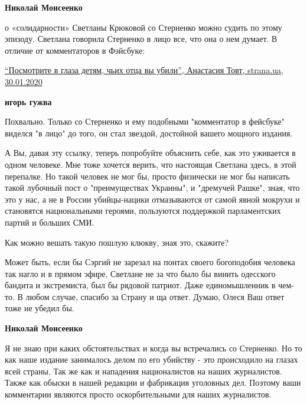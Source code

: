 \begin{itemize}
\begin{itemize}
\textbf{Николай Моисеенко} 

о «солидарности» Светланы Крюковой со Стерненко можно судить по этому эпизоду.
Светлана говорила Стерненко в лицо все, что она о нем думает. В отличие от
комментаторов в Фэйсбуке:

\href{https://strana.ua/articles/special/247259-kak-poruhalis-radikal-serhej-sternenko-i-zhurnalist-svetlana-krjukova.html}{%
\enquote{Посмотрите в глаза детям, чьих отца вы убили}, Анастасия Товт, strana.ua, 30.01.2020%
}

 

\textbf{игорь гужва} 

Похвально. Только со Стерненко и ему подобными "комментатор в фейсбуке" виделся
"в лицо" до того, он стал звездой, достойной вашего мощного издания. 

А Вы, давая эту ссылку, теперь попробуйте объяснить себе, как это уживается в
одном человеке. Мне тоже хочется верить, что настоящая Светлана здесь, в этой
перепалке. Но такой человек не мог бы, просто физически не мог бы написать
такой лубочный пост о "преимуществах Украины", и "дремучей Рашке", зная, что
это у нас, а не в России убийцы-нацики отмазываются от самой явной мокрухи и
становятся национальными героями, пользуются поддержкой парламентских партий и
больших СМИ. 

Как можно вешать такую пошлую клюкву, зная это, скажите?

Может быть, если бы Сэргий не зарезал на понтах своего богоподобия человека так
нагло и в прямом эфире, Светлане не за что было бы винить одесского бандита и
экстремиста, был бы рядовой патриот. Даже единомышленник в чем-то. В любом
случае, спасибо за Страну и ща ответ. Думаю, Олеся Ваш ответ тоже не убедил бы.


 
\textbf{Николай Моисеенко} 

Я не знаю при каких обстоятельствах и когда вы встречались со Стерненко. Но то
как наше издание занималось делом по его убийству - это происходило на глазах
всей страны. Так же как и нападения националистов на наших журналистов. Также
как обыски в нашей редакции и фабрикация уголовных дел. Поэтому ваши
комментарии являются просто оскорбительными для наших журналистов.


\end{itemize}
\end{itemize}
